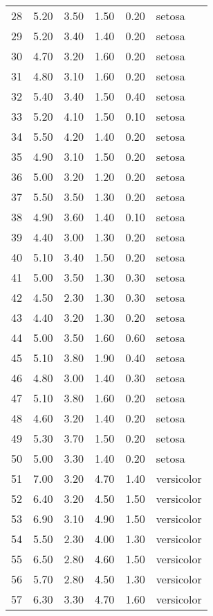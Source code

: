 \documentclass[a4paper, 10pt]{article}\usepackage[]{graphicx}\usepackage[]{color}
\begin{document}
{\begin{longtable}{rrrrrl}
  28 & 5.20 & 3.50 & 1.50 & 0.20 & setosa \\ 
  29 & 5.20 & 3.40 & 1.40 & 0.20 & setosa \\ 
  30 & 4.70 & 3.20 & 1.60 & 0.20 & setosa \\ 
  31 & 4.80 & 3.10 & 1.60 & 0.20 & setosa \\ 
  32 & 5.40 & 3.40 & 1.50 & 0.40 & setosa \\ 
  33 & 5.20 & 4.10 & 1.50 & 0.10 & setosa \\ 
  34 & 5.50 & 4.20 & 1.40 & 0.20 & setosa \\ 
  35 & 4.90 & 3.10 & 1.50 & 0.20 & setosa \\ 
  36 & 5.00 & 3.20 & 1.20 & 0.20 & setosa \\ 
  37 & 5.50 & 3.50 & 1.30 & 0.20 & setosa \\ 
  38 & 4.90 & 3.60 & 1.40 & 0.10 & setosa \\ 
  39 & 4.40 & 3.00 & 1.30 & 0.20 & setosa \\ 
  40 & 5.10 & 3.40 & 1.50 & 0.20 & setosa \\ 
  41 & 5.00 & 3.50 & 1.30 & 0.30 & setosa \\ 
  42 & 4.50 & 2.30 & 1.30 & 0.30 & setosa \\ 
  43 & 4.40 & 3.20 & 1.30 & 0.20 & setosa \\ 
  44 & 5.00 & 3.50 & 1.60 & 0.60 & setosa \\ 
  45 & 5.10 & 3.80 & 1.90 & 0.40 & setosa \\ 
  46 & 4.80 & 3.00 & 1.40 & 0.30 & setosa \\ 
  47 & 5.10 & 3.80 & 1.60 & 0.20 & setosa \\ 
  48 & 4.60 & 3.20 & 1.40 & 0.20 & setosa \\ 
  49 & 5.30 & 3.70 & 1.50 & 0.20 & setosa \\ 
  50 & 5.00 & 3.30 & 1.40 & 0.20 & setosa \\ 
  51 & 7.00 & 3.20 & 4.70 & 1.40 & versicolor \\ 
  52 & 6.40 & 3.20 & 4.50 & 1.50 & versicolor \\ 
  53 & 6.90 & 3.10 & 4.90 & 1.50 & versicolor \\ 
  54 & 5.50 & 2.30 & 4.00 & 1.30 & versicolor \\ 
  55 & 6.50 & 2.80 & 4.60 & 1.50 & versicolor \\ 
  56 & 5.70 & 2.80 & 4.50 & 1.30 & versicolor \\ 
  57 & 6.30 & 3.30 & 4.70 & 1.60 & versicolor \\ 

\end{longtable}}
\end{document}
